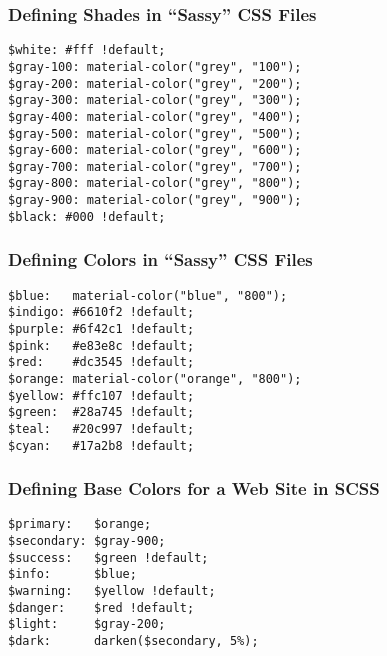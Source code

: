 \documentclass[14pt,aspectratio=169]{beamer}
\begin{document}
%
\begin{frame}[fragile]
  \frametitle{Defining Shades in ``Sassy'' CSS Files}
  \normalsize
  \begin{minipage}{6in}
    \vspace*{.1in}
    \begin{verbatim}
$white: #fff !default;
$gray-100: material-color("grey", "100");
$gray-200: material-color("grey", "200");
$gray-300: material-color("grey", "300");
$gray-400: material-color("grey", "400");
$gray-500: material-color("grey", "500");
$gray-600: material-color("grey", "600");
$gray-700: material-color("grey", "700");
$gray-800: material-color("grey", "800");
$gray-900: material-color("grey", "900");
$black: #000 !default;
    \end{verbatim}
  \end{minipage}
\end{frame}

%
\begin{frame}[fragile]
  \frametitle{Defining Colors in ``Sassy'' CSS Files}
  \normalsize
  \begin{minipage}{6in}
    \vspace*{.1in}
    \begin{verbatim}
$blue:   material-color("blue", "800");
$indigo: #6610f2 !default;
$purple: #6f42c1 !default;
$pink:   #e83e8c !default;
$red:    #dc3545 !default;
$orange: material-color("orange", "800");
$yellow: #ffc107 !default;
$green:  #28a745 !default;
$teal:   #20c997 !default;
$cyan:   #17a2b8 !default;
    \end{verbatim}
  \end{minipage}
\end{frame}

%
\begin{frame}[fragile]
  \frametitle{Defining Base Colors for a Web Site in SCSS}
  \normalsize
  \begin{minipage}{6in}
    \vspace*{.1in}
    \begin{verbatim}
$primary:   $orange;
$secondary: $gray-900;
$success:   $green !default;
$info:      $blue;
$warning:   $yellow !default;
$danger:    $red !default;
$light:     $gray-200;
$dark:      darken($secondary, 5%);
    \end{verbatim}
  \end{minipage}
\end{frame}
\end{document}
